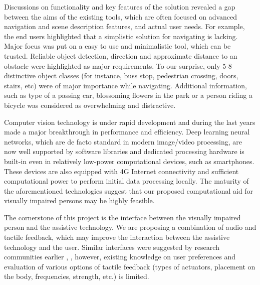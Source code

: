 \documentclass[10pt,conference,compsocconf]{IEEEtran}
\begin{document}
Discussions on functionality and key features of the solution revealed a gap between the aims of the existing tools, which are often focused on advanced navigation and scene description features, and actual user needs. For example, the end users highlighted that a simplistic solution for navigating is lacking. 
Major focus was put on a easy to use and minimalistic tool, which can be trusted. Reliable object detection, direction and approximate distance to an obstacle were highlighted as major requirements. To our surprise, only 5-8 distinctive object classes (for instance, buss stop, pedestrian crossing, doors, stairs, etc) were of major importance while navigating. Additional information, such as type of a passing car, blossoming flowers in the park or a person riding a bicycle was considered as overwhelming and distractive. 


Computer vision technology is under rapid development and during the last years made a major breakthrough in performance and efficiency. Deep learning neural networks, which are de facto standard in modern image/video processing, are now well supported by software libraries and dedicated processing hardware is built-in even in relatively low-power computational devices, such as smartphones. These devices are also equipped with 4G Internet connectivity and sufficient computational power to perform initial data processing locally. The maturity of the aforementioned technologies suggest that our proposed computational aid for visually impaired persons may be highly feasible. 


The cornerstone of this project is the interface between the visually impaired person and the assistive technology. We are proposing a combination of audio and tactile feedback, which may improve the interaction between the assistive technology and the user. Similar interfaces were suggested by research communities earlier \cite{Zientara}, \cite{Poggi}, however, existing knowledge on user preferences and evaluation of various options of tactile feedback (types of actuators, placement on the body, frequencies, strength, etc.) is limited. 
\end{document}
